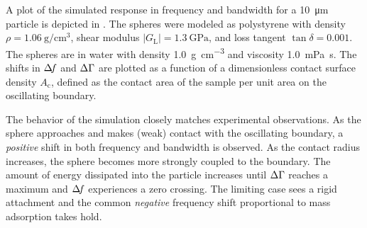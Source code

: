 A plot of the simulated response in frequency and bandwidth for a
\SI{10}{\micro\meter} particle is depicted in .
The spheres were modeled as polystyrene with density
$\rho=\SI{1.06}{\gram\per\centi\meter\cubed}$, shear modulus
$|G_\mathrm{L}|=\SI{1.3}{\giga\pascal}$, and loss tangent $\tan \delta =
0.001$.  The spheres are in water with density
\SI{1.0}{\gram\per\centi\meter\cubed} and viscosity
\SI{1.0}{\milli\pascal\second}.  The shifts in $\Delta\!f$ and $\Delta\Gamma$ are plotted
as a function of a dimensionless contact surface density $A_\mathrm{c}$,
defined as the contact area of the sample per unit area on the oscillating
boundary. 

The behavior of the simulation closely matches
experimental observations.  As the sphere approaches and makes (weak)
contact with the oscillating boundary, a \textit{positive} shift in both
frequency and bandwidth is observed.  As the contact radius increases, the
sphere becomes more strongly coupled to the boundary. The amount of energy
dissipated into the particle increases until $\Delta\Gamma$ reaches a maximum and
$\Delta\!f$ experiences a zero crossing.  The limiting case sees a rigid
attachment and the common \textit{negative} frequency shift proportional to
mass adsorption takes hold.  


